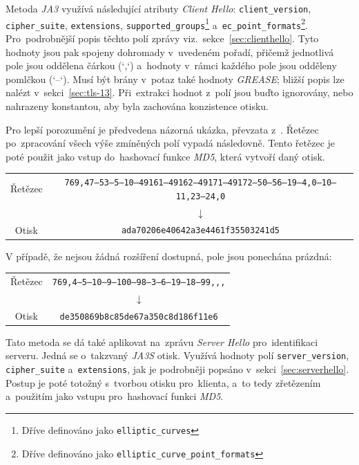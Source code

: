 Metoda \textit{JA3} využívá následující atributy \textit{Client Hello}: \texttt{client\_version}, \texttt{cipher\_suite}, \texttt{extensions}, \texttt{supported\_groups}\footnote{Dříve definováno jako \texttt{elliptic\_curves}} a~\texttt{ec\_point\_formats}\footnote{Dříve definováno jako \texttt{elliptic\_curve\_point\_formats}}. Pro~podrobnější popis těchto polí zprávy viz.~sekce~\ref{sec:clienthello}. Tyto hodnoty jsou pak spojeny dohromady v~uvedeném pořadí, přičemž jednotlivá pole jsou oddělena čárkou (`,`) a~hodnoty v~rámci každého pole jsou odděleny pomlčkou (`--`). Musí být brány v~potaz také hodnoty \textit{GREASE}; bližší popis lze nalézt v~sekci~\ref{sec:tls-13}. Při~extrakci hodnot z~polí jsou buďto ignorovány, nebo nahrazeny konstantou, aby byla zachována konzistence otisku.

Pro lepší porozumění je předvedena názorná ukázka, převzata z~\cite{Althouse2022JA3}.
Řetězec po~zpracování všech výše zmíněných polí vypadá následovně. Tento řetězec je poté použit jako vstup do~hashovací funkce \textit{MD5}, která vytvoří daný otisk.
\begin{table}[H]
	\centering
	\begin{tabular}{c|c}
		Řetězec & \verb|769,47–53–5–10–49161–49162–49171–49172–50–56–19–4,0–10–11,23–24,0| \\
		          & $\downarrow$                                                                                         \\
		Otisk     & \verb|ada70206e40642a3e4461f35503241d5|                                                              \\ 
	\end{tabular}
\end{table}

V případě, že nejsou žádná rozšíření dostupná, pole jsou ponechána prázdná:
\begin{table}[H]
	\centering
	\begin{tabular}{c|c}
		Řetězec & \verb|769,4–5–10–9–100–98–3–6–19–18–99,,,| \\        
		          & $\downarrow$                                                   \\
		Otisk     & \verb|de350869b8c85de67a350c8d186f11e6|                        \\ 
	\end{tabular}
\end{table}

Tato metoda se dá také aplikovat na~zprávu \textit{Server Hello} pro~identifikaci serveru. Jedná se o~takzvaný \textit{JA3S} otisk. Využívá hodnoty polí \texttt{server\_version}, \texttt{cipher\_suite} a~\texttt{extensions}, jak je podrobněji popsáno v~sekci~\ref{sec:serverhello}. Postup je poté totožný s~tvorbou otisku pro~klienta, a~to tedy zřetězením a~použitím jako vstupu pro~hashovací funkci \textit{MD5}.

